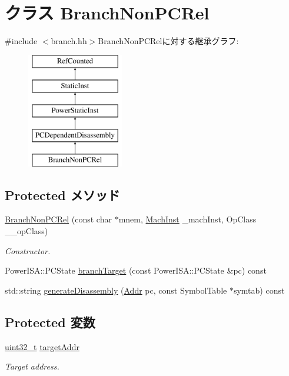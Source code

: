 \hypertarget{classPowerISA_1_1BranchNonPCRel}{
\section{クラス BranchNonPCRel}
\label{classPowerISA_1_1BranchNonPCRel}
}


{\ttfamily \#include $<$branch.hh$>$}BranchNonPCRelに対する継承グラフ:\begin{figure}[H]
\begin{center}
\leavevmode
\includegraphics[height=5cm]{classPowerISA_1_1BranchNonPCRel}
\end{center}
\end{figure}
\subsection*{Protected メソッド}
\begin{DoxyCompactItemize}
\item 
\hyperlink{classPowerISA_1_1BranchNonPCRel_a1117eecee7455c92a3da453b412e574d}{BranchNonPCRel} (const char $\ast$mnem, \hyperlink{namespacePowerISA_a301c22ea09fa33dcfe6ddf22f203699c}{MachInst} \_\-machInst, OpClass \_\-\_\-opClass)
\begin{DoxyCompactList}\small\item\em Constructor. \item\end{DoxyCompactList}\item 
PowerISA::PCState \hyperlink{classPowerISA_1_1BranchNonPCRel_a860401b0a6432ac5dbe246c64448d56d}{branchTarget} (const PowerISA::PCState \&pc) const 
\item 
std::string \hyperlink{classPowerISA_1_1BranchNonPCRel_a95d323a22a5f07e14d6b4c9385a91896}{generateDisassembly} (\hyperlink{base_2types_8hh_af1bb03d6a4ee096394a6749f0a169232}{Addr} pc, const SymbolTable $\ast$symtab) const 
\end{DoxyCompactItemize}
\subsection*{Protected 変数}
\begin{DoxyCompactItemize}
\item 
\hyperlink{Type_8hh_a435d1572bf3f880d55459d9805097f62}{uint32\_\-t} \hyperlink{classPowerISA_1_1BranchNonPCRel_af2e4ceec51be67b8f833e5e205e11ca7}{targetAddr}
\begin{DoxyCompactList}\small\item\em Target address. \item\end{DoxyCompactList}\end{DoxyCompactItemize}


